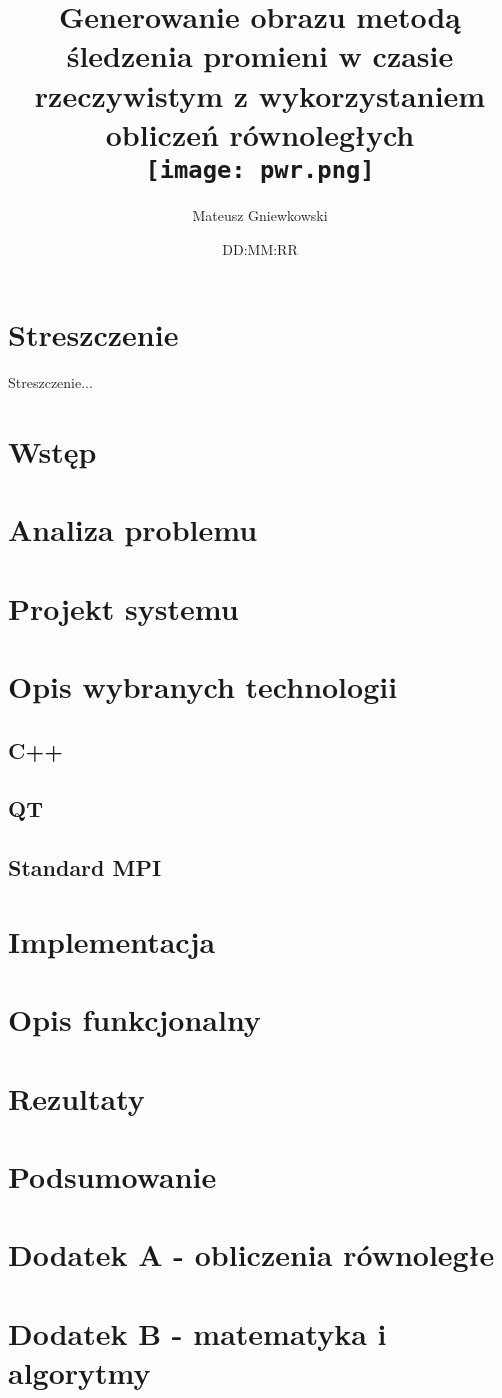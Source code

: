 \documentclass[12pt]{report}
\title{
	{Generowanie obrazu metodą śledzenia promieni w czasie rzeczywistym z wykorzystaniem obliczeń równoległych}\\
	{\texttt{[image: pwr.png]}}
}
\author{Mateusz Gniewkowski}
\date{DD:MM:RR}
\begin{document}
\maketitle

\chapter*{Streszczenie}
Streszczenie...


\tableofcontents

%

\chapter{Wstęp}


\chapter{Analiza problemu}


\chapter{Projekt systemu}


\chapter{Opis wybranych technologii}
	\section{C++}
	\section{QT}
	\section{Standard MPI}

\chapter{Implementacja}


\chapter{Opis funkcjonalny}

\chapter{Rezultaty}


\chapter{Podsumowanie}


\chapter{Dodatek A - obliczenia równoległe}
\chapter{Dodatek B - matematyka i algorytmy} 
\end{document}
